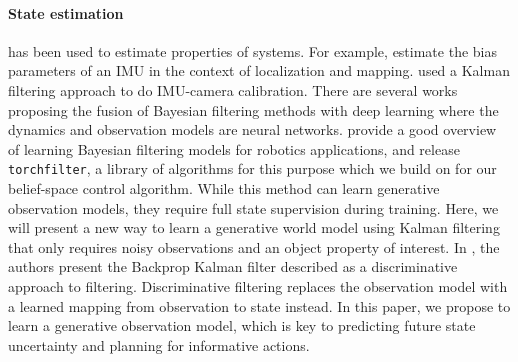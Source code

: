 \documentclass[anon]{l4dc2024}
\begin{document}


\paragraph{State estimation}
has been used to estimate properties of systems.
For example, \citet{imudrift} estimate the bias parameters of an \acf{IMU} in the context of localization and mapping.
\citet{stergios} used a Kalman filtering approach to do \ac{IMU}-camera calibration.
There are several works proposing the fusion of Bayesian filtering methods with deep learning where the dynamics and observation models are  neural networks.
\citet{bohgukf} provide a good overview of learning Bayesian filtering models for robotics applications, and release \texttt{torchfilter}, a library of algorithms for this purpose which we build on for our belief-space control algorithm.  While this method can learn generative observation models, they require full state supervision during training. Here, we will present a new way to learn a generative world model using Kalman filtering that only requires noisy observations and an object property of interest.
In \citep{backpropkf}, the authors present the Backprop Kalman filter  described as a discriminative approach to filtering.
Discriminative filtering replaces the observation model with a learned mapping from observation to state instead.
In this paper, we propose to learn a generative observation model, which is key to predicting future state uncertainty and planning for informative actions.
\end{document}

